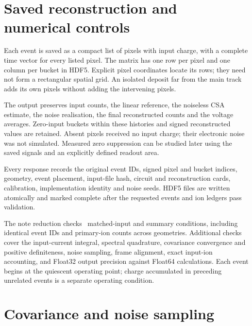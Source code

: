 \documentclass[11pt,a4paper]{article}
\begin{document}
\section{Saved reconstruction and numerical controls}

Each event is saved as a compact list of pixels with input charge, with a
complete time vector for every listed pixel. The matrix has one row per pixel
and one column per bucket in HDF5. Explicit pixel coordinates locate its rows;
they need not form a rectangular spatial grid. An isolated deposit far from
the main track adds its own pixels without adding the intervening pixels.

The output preserves input counts, the linear reference, the noiseless CSA
estimate, the noise realisation, the final reconstructed counts and the
voltage averages. Zero-input buckets within these histories and signed
reconstructed values are retained. Absent pixels received no input charge;
their electronic noise was not simulated. Measured zero suppression can be
studied later using the saved signals and an explicitly defined readout area.

Every response records the original event IDs, signed pixel and bucket
indices, geometry, event placement, input-file hash, circuit and reconstruction
cards, calibration, implementation identity and noise seeds. HDF5 files are
written atomically and marked complete after the requested events and ion
ledgers pass validation.

\begin{table}[htbp]\centering\small
\caption{Numerical response controls after reconstruction. Errors are measured
relative to the corresponding frame ENC.}
\label{tab:validation}

\end{table}

The note reduction checks \CsaNoteChecks\ matched-input and summary conditions,
including identical event IDs and primary-ion counts across geometries.
Additional checks cover the input-current integral, spectral quadrature,
covariance convergence and positive definiteness, noise sampling, frame
alignment, exact input-ion accounting, and Float32 output precision against
Float64 calculations. Each event begins at the quiescent operating point;
charge accumulated in preceding unrelated events is a separate operating
condition.

\appendix
\section{Covariance and noise sampling}
\end{document}

